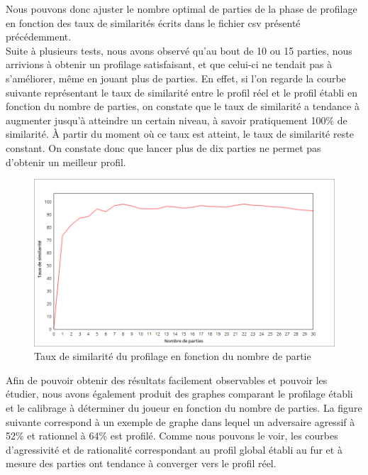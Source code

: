 \documentclass{report}
\begin{document}
Nous pouvons donc ajuster le nombre optimal de parties de la phase de profilage en fonction des taux de similarités écrits dans le fichier csv présenté précédemment.\\

Suite à plusieurs tests, nous avons observé qu'au bout de 10 ou 15 parties, nous arrivions à obtenir un profilage satisfaisant, et que celui-ci ne tendait pas à s'améliorer, même en jouant plus de parties. En effet, si l'on regarde la courbe suivante représentant le taux de similarité entre le profil réel et le profil établi en fonction du nombre de parties, on constate que le taux de similarité a tendance à augmenter jusqu'à atteindre un certain niveau, à savoir pratiquement 100\% de similarité. À partir du moment où ce taux est atteint, le taux de similarité reste constant. On constate donc que lancer plus de dix parties ne permet pas d'obtenir un meilleur profil. \\


\begin{figure}[H]
\hspace{-2cm}
		\includegraphics[scale=0.5]{./imagesRapport/profilageScenariosTestsAnalyseResultats.png}
	\caption{Taux de similarité du profilage en fonction du nombre de partie}
\end{figure}


Afin de pouvoir obtenir des résultats facilement observables et pouvoir les étudier, nous avons également produit des graphes comparant le profilage établi et le calibrage à déterminer du joueur en fonction du nombre de parties. La figure suivante correspond à un exemple de graphe dans lequel un adversaire agressif à 52\% et rationnel à 64\% est profilé. Comme nous pouvons le voir, les courbes d'agressivité et de rationalité correspondant au profil global établi au fur et à mesure des parties ont tendance à converger vers le profil réel. \\
\end{document}
